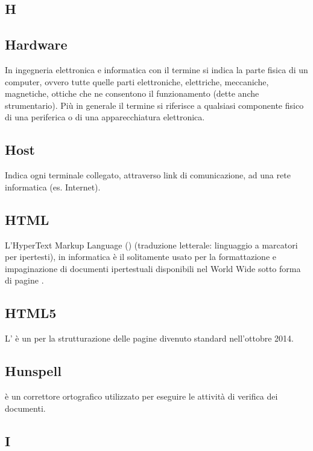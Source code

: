 \newpage

\begin{center}
\Huge\section*{\uppercase{H}}
\end{center}

\subsection*{Hardware}
In ingegneria elettronica e informatica con il termine  si indica la parte fisica
di un computer, ovvero tutte quelle parti elettroniche, elettriche, meccaniche, magnetiche,
ottiche che ne consentono il funzionamento (dette anche strumentario). Più in generale il
termine si riferisce a qualsiasi componente fisico di una periferica o di una apparecchiatura
elettronica.

\subsection*{Host}
Indica ogni terminale collegato, attraverso link di comunicazione, ad una rete informatica (es. Internet).

\subsection*{HTML}
L'HyperText Markup Language () (traduzione letterale: linguaggio a marcatori per ipertesti), in informatica è il  solitamente usato per la formattazione e impaginazione di documenti ipertestuali disponibili nel World Wide  sotto forma di pagine .

\subsection*{HTML5}
L’ è un  per la strutturazione delle pagine  divenuto
standard  nell’ottobre 2014.

\subsection*{Hunspell}
 è un correttore ortografico utilizzato per eseguire le attività di verifica dei documenti.

\newpage

\begin{center}
\Huge\section*{\uppercase{I}}
\end{center}

